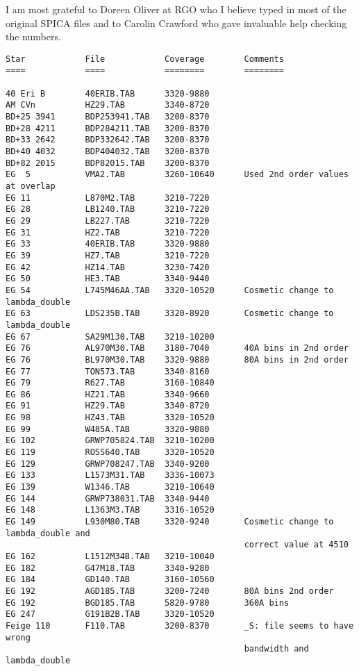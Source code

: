    I am most grateful to Doreen Oliver at RGO who I believe typed in
   most of the original SPICA files and to Carolin Crawford who gave
   invaluable help checking the numbers.

\small\begin{verbatim}
Star            File            Coverage        Comments
====            ====            ========        ========

40 Eri B        40ERIB.TAB      3320-9880
AM CVn          HZ29.TAB        3340-8720
BD+25 3941      BDP253941.TAB   3200-8370
BD+28 4211      BDP284211.TAB   3200-8370
BD+33 2642      BDP332642.TAB   3200-8370
BD+40 4032      BDP404032.TAB   3200-8370
BD+82 2015      BDP82015.TAB    3200-8370
EG  5           VMA2.TAB        3260-10640      Used 2nd order values at overlap
EG 11           L870M2.TAB      3210-7220
EG 28           LB1240.TAB      3210-7220
EG 29           LB227.TAB       3210-7220
EG 31           HZ2.TAB         3210-7220
EG 33           40ERIB.TAB      3320-9880
EG 39           HZ7.TAB         3210-7220
EG 42           HZ14.TAB        3230-7420
EG 50           HE3.TAB         3340-9440
EG 54           L745M46AA.TAB   3320-10520      Cosmetic change to lambda_double
EG 63           LDS235B.TAB     3320-8920       Cosmetic change to lambda_double
EG 67           SA29M130.TAB    3210-10200
EG 76           AL970M30.TAB    3180-7040       40A bins in 2nd order
EG 76           BL970M30.TAB    3320-9880       80A bins in 2nd order
EG 77           TON573.TAB      3340-8160
EG 79           R627.TAB        3160-10840
EG 86           HZ21.TAB        3340-9660
EG 91           HZ29.TAB        3340-8720
EG 98           HZ43.TAB        3320-10520
EG 99           W485A.TAB       3320-9880
EG 102          GRWP705824.TAB  3210-10200
EG 119          ROSS640.TAB     3320-10520
EG 129          GRWP708247.TAB  3340-9200
EG 133          L1573M31.TAB    3336-10073
EG 139          W1346.TAB       3210-10640
EG 144          GRWP738031.TAB  3340-9440
EG 148          L1363M3.TAB     3316-10520
EG 149          L930M80.TAB     3320-9240       Cosmetic change to lambda_double and
                                                correct value at 4510
EG 162          L1512M34B.TAB   3210-10040
EG 182          G47M18.TAB      3340-9280
EG 184          GD140.TAB       3160-10560
EG 192          AGD185.TAB      3200-7240       80A bins 2nd order
EG 192          BGD185.TAB      5820-9780       360A bins
EG 247          G191B2B.TAB     3320-10520
Feige 110       F110.TAB        3200-8370       _S: file seems to have wrong
                                                bandwidth and lambda_double

\end{verbatim}
